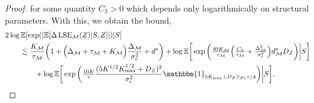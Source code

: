 \documentclass[10pt]{article}
\theoremstyle{plain}
\theoremstyle{definition}
\theoremstyle{remark}
\newcommand{\M}{{\mathcal{M}}}
\newcommand{\lse}{\operatorname{LSE}}
\newcommand{\E}{\mathbb{E}}
\newcommand{\gap}{\Delta_\M}
\begin{document}
\begin{proof}
for some quantity \(C_3 > 0\) which depends only logarithmically on structural parameters. With this, we obtain the bound,
\begin{align}
    & 2\log \E[\exp ( | \E[\Delta \lse_\M(Z)|S, Z] |) | S] \nonumber\\
    & \qquad \lesssim \frac{K_\M}{\tau_\M} \bigg ( 1 + \Big (\gap + \tau_\M + K_\M\Big ) \frac{\gap}{\sigma_\epsilon^2} + d^* \bigg ) + \log \E \bigg [ \exp \bigg ( \tfrac{40 K_\M}{\tau_\M} \Big ( \tfrac{C_3}{\tau_\M} + \tfrac{\gap^2}{\sigma^2_\epsilon} \Big ) d_\M^* D_Z \bigg ) \bigg | S \bigg ]\nonumber\\
    & \qquad \qquad + \log \E \bigg [ \exp \bigg ( \tfrac{10 K}{\tau} \frac{(5 K^{1/2} K_{\max}^{1/2} + D_Z)^2}{\sigma^2_\epsilon} \mathbbm{1}_{5 K_{\max} + D_Z \geq \mu_\epsilon \tau / 4} \bigg ) \bigg | S \bigg ].\label{eq:geom_2}
\end{align}


\end{proof}
\end{document}
